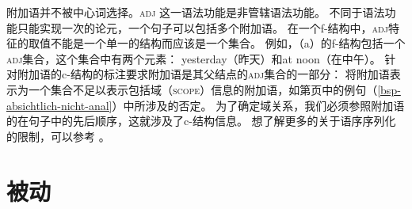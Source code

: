 附加语并不被中心词选择。\textsc{adj}
这一语法功能是非管辖语法功能。
不同于语法功能只能实现一次的论元，一个句子可以包括多个附加语。
在一个f-结构中，\textsc{adj}特征的取值不能是一个单一的结构而应该是一个集合。
例如，（a）的f-结构包括一个\textsc{adj}集合，这个集合中有两个元素：
yesterday（昨天）和at noon（在中午）。
\eal
{}
\ex\label{fstruc-david-devoured-a-sandwich-at-noon-yesterday} 
\zl
%
针对附加语的c-结构的标注要求附加语是其父结点的\textsc{adj}集合的一部分：
\ea
{}
\z
将附加语表示为一个集合不足以表示包括域（\textsc{scope}）信息的附加语，如第\pageref{bsp-absichtlich-nicht-anal}页中的例句（\ref{bsp-absichtlich-nicht-anal}）中所涉及的否定。
为了确定域关系，我们必须参照附加语的在句子中的先后顺序，这就涉及了c-结构信息。
想了解更多的关于语序序列化的限制，可以参考 。

\section{被动}
\label{Abschnitt-LFG-Passiv}


